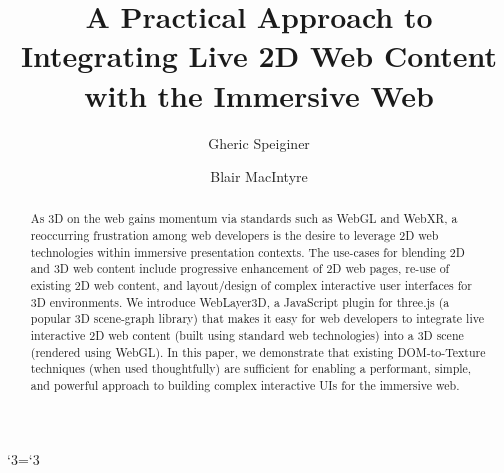 \documentclass[sigconf]{acmart}
\begin{document}
%
\title{A Practical Approach to Integrating Live 2D Web Content with the Immersive Web}

%

\author{Gheric Speiginer}

\author{Blair MacIntyre}


%
\renewcommand{\shortauthors}{Speiginer and MacIntyre}

\lccode`3=`3


%
\begin{abstract}
 As 3D on the web gains momentum via standards such as WebGL and WebXR, a reoccurring frustration among web developers is the desire to leverage 2D web technologies within immersive presentation contexts. The use-cases for blending 2D and 3D web content include progressive enhancement of 2D web pages, re-use of existing 2D web content, and layout/design of complex interactive user interfaces for 3D environments. We introduce WebLayer3D, a JavaScript plugin for three.js (a popular 3D scene-graph library) that makes it easy for web developers to integrate live interactive 2D web content (built using standard web technologies) into a 3D scene (rendered using WebGL). In this paper, we demonstrate that existing DOM-to-Texture techniques (when used thoughtfully) are sufficient for enabling a performant, simple, and powerful approach to building complex interactive UIs for the immersive web.
\end{abstract}
\end{document}
